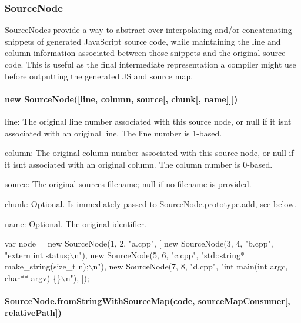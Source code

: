 \subsubsection*{Source\+Node}

Source\+Nodes provide a way to abstract over interpolating and/or concatenating snippets of generated Java\+Script source code, while maintaining the line and column information associated between those snippets and the original source code. This is useful as the final intermediate representation a compiler might use before outputting the generated JS and source map.

\paragraph*{new Source\+Node(\mbox{[}line, column, source\mbox{[}, chunk\mbox{[}, name\mbox{]}\mbox{]}\mbox{]})}


\begin{DoxyItemize}
\item {\ttfamily line}\+: The original line number associated with this source node, or null if it isn\textquotesingle{}t associated with an original line. The line number is 1-\/based.
\item {\ttfamily column}\+: The original column number associated with this source node, or null if it isn\textquotesingle{}t associated with an original column. The column number is 0-\/based.
\item {\ttfamily source}\+: The original source\textquotesingle{}s filename; null if no filename is provided.
\item {\ttfamily chunk}\+: Optional. Is immediately passed to {\ttfamily Source\+Node.\+prototype.\+add}, see below.
\item {\ttfamily name}\+: Optional. The original identifier.
\end{DoxyItemize}


\begin{DoxyCode}
var node = new SourceNode(1, 2, "a.cpp", [
  new SourceNode(3, 4, "b.cpp", "extern int status;\(\backslash\)n"),
  new SourceNode(5, 6, "c.cpp", "std::string* make\_string(size\_t n);\(\backslash\)n"),
  new SourceNode(7, 8, "d.cpp", "int main(int argc, char** argv) \{\}\(\backslash\)n"),
]);
\end{DoxyCode}


\paragraph*{Source\+Node.\+from\+String\+With\+Source\+Map(code, source\+Map\+Consumer\mbox{[}, relative\+Path\mbox{]})}

